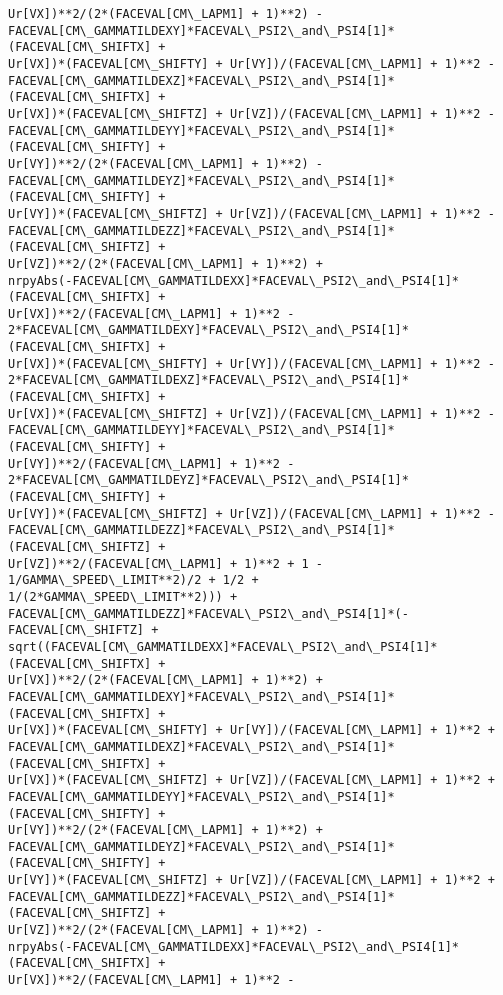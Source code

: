 \documentclass[landscape,letterpaper,10pt,english]{article}
\begin{document}
\begin{Verbatim}[commandchars=\\\{\}]
Ur[VX])**2/(2*(FACEVAL[CM\_LAPM1] + 1)**2) -
FACEVAL[CM\_GAMMATILDEXY]*FACEVAL\_PSI2\_and\_PSI4[1]*(FACEVAL[CM\_SHIFTX] +
Ur[VX])*(FACEVAL[CM\_SHIFTY] + Ur[VY])/(FACEVAL[CM\_LAPM1] + 1)**2 -
FACEVAL[CM\_GAMMATILDEXZ]*FACEVAL\_PSI2\_and\_PSI4[1]*(FACEVAL[CM\_SHIFTX] +
Ur[VX])*(FACEVAL[CM\_SHIFTZ] + Ur[VZ])/(FACEVAL[CM\_LAPM1] + 1)**2 -
FACEVAL[CM\_GAMMATILDEYY]*FACEVAL\_PSI2\_and\_PSI4[1]*(FACEVAL[CM\_SHIFTY] +
Ur[VY])**2/(2*(FACEVAL[CM\_LAPM1] + 1)**2) -
FACEVAL[CM\_GAMMATILDEYZ]*FACEVAL\_PSI2\_and\_PSI4[1]*(FACEVAL[CM\_SHIFTY] +
Ur[VY])*(FACEVAL[CM\_SHIFTZ] + Ur[VZ])/(FACEVAL[CM\_LAPM1] + 1)**2 -
FACEVAL[CM\_GAMMATILDEZZ]*FACEVAL\_PSI2\_and\_PSI4[1]*(FACEVAL[CM\_SHIFTZ] +
Ur[VZ])**2/(2*(FACEVAL[CM\_LAPM1] + 1)**2) +
nrpyAbs(-FACEVAL[CM\_GAMMATILDEXX]*FACEVAL\_PSI2\_and\_PSI4[1]*(FACEVAL[CM\_SHIFTX] +
Ur[VX])**2/(FACEVAL[CM\_LAPM1] + 1)**2 -
2*FACEVAL[CM\_GAMMATILDEXY]*FACEVAL\_PSI2\_and\_PSI4[1]*(FACEVAL[CM\_SHIFTX] +
Ur[VX])*(FACEVAL[CM\_SHIFTY] + Ur[VY])/(FACEVAL[CM\_LAPM1] + 1)**2 -
2*FACEVAL[CM\_GAMMATILDEXZ]*FACEVAL\_PSI2\_and\_PSI4[1]*(FACEVAL[CM\_SHIFTX] +
Ur[VX])*(FACEVAL[CM\_SHIFTZ] + Ur[VZ])/(FACEVAL[CM\_LAPM1] + 1)**2 -
FACEVAL[CM\_GAMMATILDEYY]*FACEVAL\_PSI2\_and\_PSI4[1]*(FACEVAL[CM\_SHIFTY] +
Ur[VY])**2/(FACEVAL[CM\_LAPM1] + 1)**2 -
2*FACEVAL[CM\_GAMMATILDEYZ]*FACEVAL\_PSI2\_and\_PSI4[1]*(FACEVAL[CM\_SHIFTY] +
Ur[VY])*(FACEVAL[CM\_SHIFTZ] + Ur[VZ])/(FACEVAL[CM\_LAPM1] + 1)**2 -
FACEVAL[CM\_GAMMATILDEZZ]*FACEVAL\_PSI2\_and\_PSI4[1]*(FACEVAL[CM\_SHIFTZ] +
Ur[VZ])**2/(FACEVAL[CM\_LAPM1] + 1)**2 + 1 - 1/GAMMA\_SPEED\_LIMIT**2)/2 + 1/2 +
1/(2*GAMMA\_SPEED\_LIMIT**2))) +
FACEVAL[CM\_GAMMATILDEZZ]*FACEVAL\_PSI2\_and\_PSI4[1]*(-FACEVAL[CM\_SHIFTZ] +
sqrt((FACEVAL[CM\_GAMMATILDEXX]*FACEVAL\_PSI2\_and\_PSI4[1]*(FACEVAL[CM\_SHIFTX] +
Ur[VX])**2/(2*(FACEVAL[CM\_LAPM1] + 1)**2) +
FACEVAL[CM\_GAMMATILDEXY]*FACEVAL\_PSI2\_and\_PSI4[1]*(FACEVAL[CM\_SHIFTX] +
Ur[VX])*(FACEVAL[CM\_SHIFTY] + Ur[VY])/(FACEVAL[CM\_LAPM1] + 1)**2 +
FACEVAL[CM\_GAMMATILDEXZ]*FACEVAL\_PSI2\_and\_PSI4[1]*(FACEVAL[CM\_SHIFTX] +
Ur[VX])*(FACEVAL[CM\_SHIFTZ] + Ur[VZ])/(FACEVAL[CM\_LAPM1] + 1)**2 +
FACEVAL[CM\_GAMMATILDEYY]*FACEVAL\_PSI2\_and\_PSI4[1]*(FACEVAL[CM\_SHIFTY] +
Ur[VY])**2/(2*(FACEVAL[CM\_LAPM1] + 1)**2) +
FACEVAL[CM\_GAMMATILDEYZ]*FACEVAL\_PSI2\_and\_PSI4[1]*(FACEVAL[CM\_SHIFTY] +
Ur[VY])*(FACEVAL[CM\_SHIFTZ] + Ur[VZ])/(FACEVAL[CM\_LAPM1] + 1)**2 +
FACEVAL[CM\_GAMMATILDEZZ]*FACEVAL\_PSI2\_and\_PSI4[1]*(FACEVAL[CM\_SHIFTZ] +
Ur[VZ])**2/(2*(FACEVAL[CM\_LAPM1] + 1)**2) -
nrpyAbs(-FACEVAL[CM\_GAMMATILDEXX]*FACEVAL\_PSI2\_and\_PSI4[1]*(FACEVAL[CM\_SHIFTX] +
Ur[VX])**2/(FACEVAL[CM\_LAPM1] + 1)**2 -

\end{Verbatim}
\end{document}
